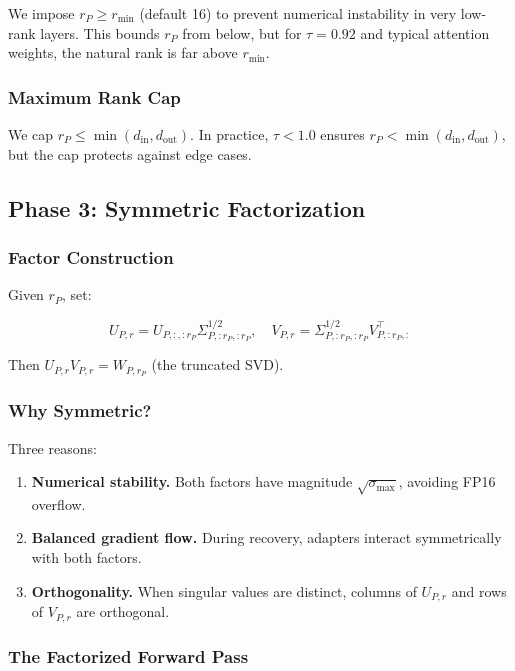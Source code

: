 We impose $r_P \geq r_\text{min}$ (default 16) to prevent numerical 
instability in very low-rank layers. This bounds $r_P$ from below, but for 
$\tau = 0.92$ and typical attention weights, the natural rank is far above 
$r_\text{min}$.

\subsubsection{Maximum Rank Cap}

We cap $r_P \leq \min(d_\text{in}, d_\text{out})$. In practice, $\tau < 1.0$ 
ensures $r_P < \min(d_\text{in}, d_\text{out})$, but the cap protects against 
edge cases.

\subsection{Phase 3: Symmetric Factorization}

\subsubsection{Factor Construction}

Given $r_P$, set:

\[
U_{P, r} = U_{P, :, :r_P} \Sigma_{P, :r_P, :r_P}^{1/2}, \quad
V_{P, r} = \Sigma_{P, :r_P, :r_P}^{1/2} V_{P, :r_P, :}^\top
\tag{4.4}
\]

Then $U_{P, r} V_{P, r} = W_{P, r_P}$ (the truncated SVD).

\subsubsection{Why Symmetric?}

Three reasons:

\begin{enumerate}
\item \textbf{Numerical stability.} Both factors have magnitude $\sqrt{\sigma_\text{max}}$,
  avoiding FP16 overflow.

\item \textbf{Balanced gradient flow.} During recovery, adapters interact symmetrically
  with both factors.

\item \textbf{Orthogonality.} When singular values are distinct, columns of $U_{P, r}$
  and rows of $V_{P, r}$ are orthogonal.

\end{enumerate}
\subsubsection{The Factorized Forward Pass}

